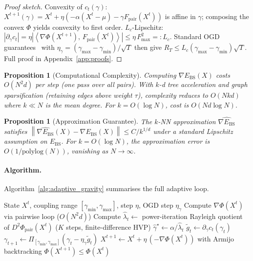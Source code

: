\documentclass[11pt]{article}
\newtheorem{proposition}[theorem]{Proposition}
\theoremstyle{definition}
\newcommand{\grad}{\nabla}
\newcommand{\Ebs}{E_{\mathrm{BS}}}
\newcommand{\norm}[1]{\left\|#1\right\|}
\newcommand{\inner}[2]{\left\langle #1,\, #2\right\rangle}
\begin{document}
\begin{proof}[Proof sketch]
Convexity of $c_t(\gamma)$: $X^{t+1}(\gamma) = X^t + \eta(-\alpha(X^t-\mu) -
\gamma F_{\mathrm{pair}}(X^t))$ is affine in $\gamma$; composing the convex $\Phi$
yields convexity to first order.  $L_c$-Lipschitz: $|\partial_\gamma c_t| =
\eta|\inner{\grad\Phi(X^{t+1})}{F_{\mathrm{pair}}(X^t)}| \le \eta\, F_{\max}^2 =: L_c$.
Standard OGD guarantees~\citep{hazan2016oco} with $\eta_\gamma = (\gamma_{\max}-\gamma_{\min})/\sqrt{T}$
then give $R_T \le L_c(\gamma_{\max}-\gamma_{\min})\sqrt{T}$.  Full proof in
Appendix~\ref{app:proofs}.
\end{proof}

\begin{proposition}[Computational Complexity]
\label{prop:cs2}
Computing $\grad\Ebs(X)$ costs $O(N^2 d)$ per step (one pass over all pairs).
With $k$-d tree acceleration and graph sparsification (retaining edges above
weight $\tau$), complexity reduces to $O(N k d)$ where $k \ll N$ is the mean
degree.  For $k = O(\log N)$, cost is $O(N d \log N)$.
\end{proposition}

\begin{proposition}[Approximation Guarantee]
\label{prop:cs3}
The $k$-NN approximation $\widehat{\grad\Ebs}$ satisfies
$\norm{\widehat{\grad\Ebs}(X) - \grad\Ebs(X)} \le C/k^{1/d}$
under a standard Lipschitz assumption on $\Ebs$.  For $k = O(\log N)$,
the approximation error is $O(1/\mathrm{polylog}(N))$, vanishing as $N\to\infty$.
\end{proposition}

\paragraph{Algorithm.}
Algorithm~\ref{alg:adaptive_gravity} summarises the full adaptive loop.

\begin{algorithm}[H]
\caption{Adaptive GravityEngine (one outer step)}
\label{alg:adaptive_gravity}
\begin{algorithmic}[1]
\Require State $X^t$, coupling range $[\gamma_{\min},\gamma_{\max}]$, step $\eta$,
         OGD step $\eta_\gamma$
\State Compute $\grad\Phi(X^t)$ via pairwise loop ($O(N^2 d)$)
\State Compute $\hat\lambda_t \leftarrow$ power-iteration Rayleigh quotient
       of $D^2\Phi_{\mathrm{pair}}(X^t)$ ($K$ steps, finite-difference HVP)
\State $\hat\gamma^\star \leftarrow \alpha / \hat\lambda_t$  
\State $\tilde g_t \leftarrow \partial_\gamma c_t(\gamma_t)$  
\State $\gamma_{t+1} \leftarrow \Pi_{[\gamma_{\min},\gamma_{\max}]}(\gamma_t - \eta_\gamma \tilde g_t)$
\State $X^{t+1} \leftarrow X^t + \eta\,(-\grad\Phi(X^t))$ with Armijo backtracking
\Ensure $\Phi(X^{t+1}) \le \Phi(X^t)$
\end{algorithmic}
\end{algorithm}
\end{document}
